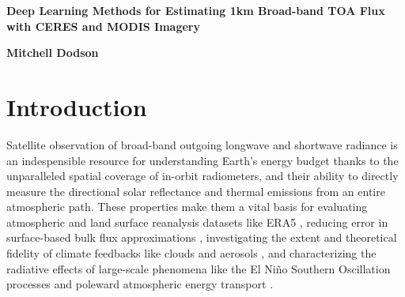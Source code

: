 \documentclass[12pt]{article}
\begin{document}

{\large\begin{center}\textbf{Deep Learning Methods for Estimating 1km Broad-band TOA Flux with CERES and MODIS Imagery}\end{center}}

{\begin{center}\textbf{Mitchell Dodson}\end{center}}

    \vspace{-1em}
\section{Introduction}
\vspace{-1em}

Satellite observation of broad-band outgoing longwave and shortwave radiance is an indespensible resource for understanding Earth's energy budget thanks to the unparalleled spatial coverage of in-orbit radiometers, and their ability to directly measure the directional solar reflectance and thermal emissions from an entire atmospheric path. These properties make them a vital basis for evaluating atmospheric and land surface reanalysis datasets like ERA5 \cite{loeb_evaluating_2022}, reducing error in surface-based bulk flux approximations \cite{yu_global_2019}, investigating the extent and theoretical fidelity of climate feedbacks like clouds and aerosols \cite{ramanathan_cloud-radiative_1989}\cite{zhang_longwave_2003}, and characterizing the radiative effects of large-scale phenomena like the El Ni\~no Southern Oscillation processes and poleward atmospheric energy transport \cite{loeb_observing_2014}\cite{mayer_poleward_2012}.
\end{document}

